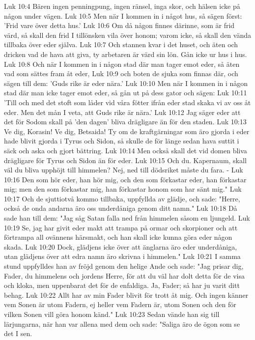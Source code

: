 Luk 10:4  Bären ingen penningpung, ingen ränsel, inga skor, och hälsen icke på någon under vägen.
Luk 10:5  Men när I kommen in i något hus, så sägen först: 'Frid vare över detta hus.'
Luk 10:6  Om då någon finnes därinne, som är frid värd, så skall den frid I tillönsken vila över honom; varom icke, så skall den vända tillbaka över eder själva.
Luk 10:7  Och stannen kvar i det huset, och äten och dricken vad de hava att giva, ty arbetaren är värd sin lön. Gån icke ur hus i hus.
Luk 10:8  Och när I kommen in i någon stad där man tager emot eder, så äten vad som sättes fram åt eder,
Luk 10:9  och boten de sjuka som finnas där, och sägen till dem: 'Guds rike är eder nära.'
Luk 10:10  Men när I kommen in i någon stad där man icke tager emot eder, så gån ut på dess gator och sägen:
Luk 10:11  'Till och med det stoft som låder vid våra fötter ifrån eder stad skaka vi av oss åt eder. Men det mån I veta, att Guds rike är nära.'
Luk 10:12  Jag säger eder att det för Sodom skall på 'den dagen' bliva drägligare än för den staden.
Luk 10:13  Ve dig, Korasin! Ve dig, Betsaida! Ty om de kraftgärningar som äro gjorda i eder hade blivit gjorda i Tyrus och Sidon, så skulle de för länge sedan hava suttit i säck och aska och gjort bättring.
Luk 10:14  Men också skall det vid domen bliva drägligare för Tyrus och Sidon än för eder.
Luk 10:15  Och du. Kapernaum, skall väl du bliva upphöjt till himmelen? Nej, ned till dödsriket måste du fara. -
Luk 10:16  Den som hör eder, han hör mig, och den som förkastar eder, han förkastar mig; men den som förkastar mig, han förkastar honom som har sänt mig."
Luk 10:17  Och de sjuttiotvå kommo tillbaka, uppfyllda av glädje, och sade: "Herre, också de onda andarna äro oss underdåniga genom ditt namn."
Luk 10:18  Då sade han till dem: "Jag såg Satan falla ned från himmelen såsom en ljungeld.
Luk 10:19  Se, jag har givit eder makt att trampa på ormar och skorpioner och att förtrampa all ovännens härsmakt, och han skall icke kunna göra eder någon skada.
Luk 10:20  Dock, glädjens icke över att änglarna äro eder underdåniga, utan glädjens över att edra namn äro skrivna i himmelen."
Luk 10:21  I samma stund uppfylldes han av fröjd genom den helige Ande och sade: "Jag prisar dig, Fader, du himmelens och jordens Herre, för att du väl har dolt detta för de visa och kloka, men uppenbarat det för de enfaldiga. Ja, Fader; så har ju varit ditt behag.
Luk 10:22  Allt har av min Fader blivit för trott åt mig. Och ingen känner vem Sonen är utom Fadern, ej heller vem Fadern är, utom Sonen och den för vilken Sonen vill göra honom känd."
Luk 10:23  Sedan vände han sig till lärjungarna, när han var allena med dem och sade: "Saliga äro de ögon som se det I sen.
